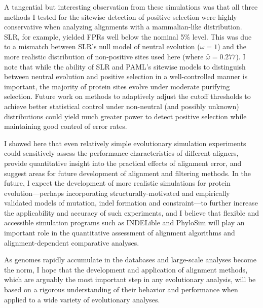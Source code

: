 A tangential but interesting observation from these simulations was that
all three methods I tested for the sitewise detection of positive
selection were highly conservative when analyzing alignments with a
mammalian-like \omg distribution. SLR, for example, yielded FPRs
well below the nominal 5\% level. This was due to a mismatch between
SLR's null model of neutral evolution ($\omega=1$) and the more
realistic distribution of non-positive sites used here (where
$\bar{\omega}=0.277$). I note that while the ability of SLR and PAML's
sitewise models to distinguish between neutral evolution and positive
selection in a well-controlled manner is important, the majority of
protein sites evolve under moderate purifying selection. Future work
on methods to adaptively adjust the cutoff thresholds to achieve
better statistical control under non-neutral (and possibly unknown)
\omg distributions could yield much greater power to detect positive
selection while maintaining good control of error rates.

I showed here that even relatively simple evolutionary simulation
experiments could sensitively assess the performance characteristics
of different aligners, provide quantitative insight into the practical
effects of alignment error, and suggest areas for future development
of alignment and filtering methods. In the future, I expect the
development of more realistic simulations for protein
evolution---perhaps incorporating structurally-motivated and
empirically validated models of mutation, indel formation and
constraint---to further increase the applicability and accuracy of
such experiments, and I believe that flexible and accessible
simulation programs such as INDELible \citep{Fletcher2009INDELible}
and PhyloSim \citep{Sipos2011PhyloSim} will play an important role in
the quantitative assessment of alignment algorithms and
alignment-dependent comparative analyses.

As genomes rapidly accumulate in the databases and
large-scale analyses become the norm, I hope that the development and
application of alignment methods, which are arguably the most
important step in any evolutionary analysis, will be based on a
rigorous understanding of their behavior and performance when applied
to a wide variety of evolutionary analyses.

